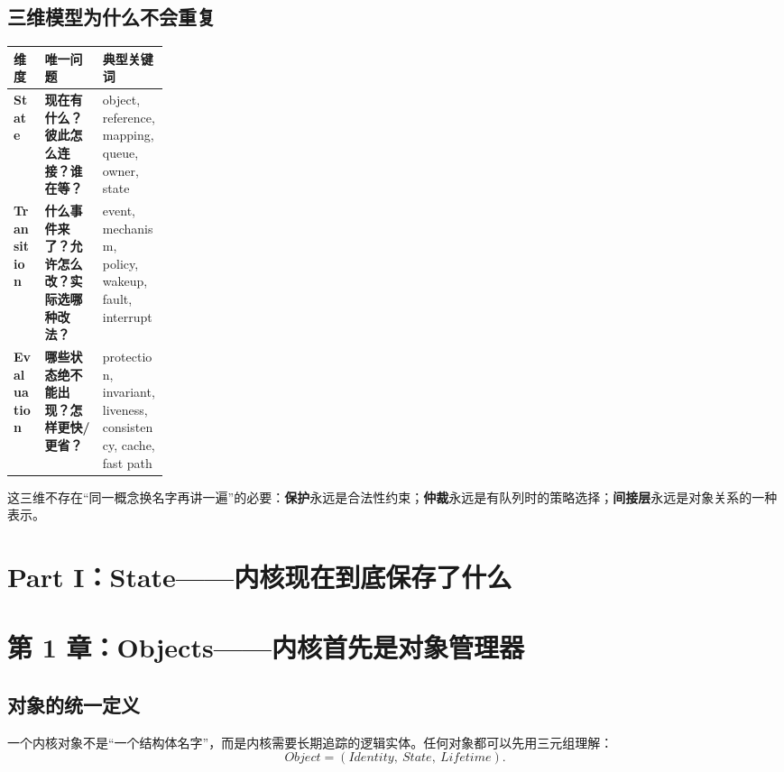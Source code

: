 \documentclass[11pt,a4paper]{ctexart}
\newcommand{\kw}[1]{\textbf{#1}}
\begin{document}
\subsection{三维模型为什么不会重复}
\begin{center}
\small
\begin{tabularx}{\linewidth}{>{\bfseries}p{0.20\linewidth} X X}
\toprule
维度 & 唯一问题 & 典型关键词 \\
\midrule
State & \kw{现在有什么？彼此怎么连接？谁在等？} & object, reference, mapping, queue, owner, state \\
Transition & \kw{什么事件来了？允许怎么改？实际选哪种改法？} & event, mechanism, policy, wakeup, fault, interrupt \\
Evaluation & \kw{哪些状态绝不能出现？怎样更快/更省？} & protection, invariant, liveness, consistency, cache, fast path \\
\bottomrule
\end{tabularx}
\end{center}

这三维不存在“同一概念换名字再讲一遍”的必要：\kw{保护}永远是合法性约束；\kw{仲裁}永远是有队列时的策略选择；\kw{间接层}永远是对象关系的一种表示。

\newpage
\section{Part I：State——内核现在到底保存了什么}

\section{第 1 章：Objects——内核首先是对象管理器}

\subsection{对象的统一定义}
一个内核对象不是“一个结构体名字”，而是内核需要长期追踪的逻辑实体。任何对象都可以先用三元组理解：
\[
\boxed{Object=(Identity,\ State,\ Lifetime)}.
\]
\end{document}
